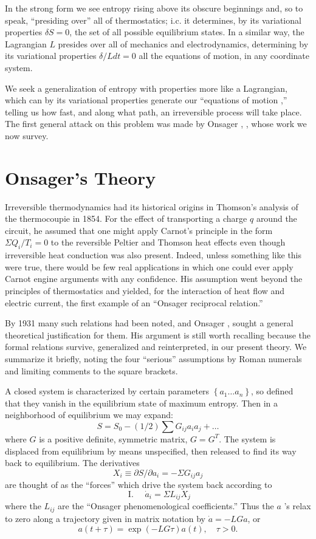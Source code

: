 \documentclass{article}
\begin{document}
In the strong form we see entropy rising above its obscure beginnings and, so to speak, ``presiding over'' all of thermostatics; i.c. it determines, by its variational properties $\delta S=0$, the set of all possible equilibrium states. In a similar way, the Lagrangian $L$ presides over all of mechanics and electrodynamics, determining by its variational properties $\delta / L d t=0$ all the equations of motion, in any coordinate system.

We seek a generalization of entropy with properties more like a Lagrangian, which can by its variational properties generate our ``equations of motion ,'' telling us how fast, and along what path, an irreversible process will take place. The first general attack on this problem was made by Onsager \cite{onsager1931a}, \cite{onsager1931b}, whose work we now survey.

\section{Onsager's Theory}

Irreversible thermodynamics had its historical origins in Thomson's analysis of the thermocoupie in 1854. For the effect of transporting a charge $q$ around the circuit, he assumed that one might apply Carnot's principle in the form $\Sigma Q_i / T_i=0$ to the reversible Peltier and Thomson heat effects even though irreversible heat conduction was also present. Indeed, unless something like this were true, there would be few real applications in which one could ever apply Carnot engine arguments with any confidence. His assumption went beyond the principles of thermostatics and yielded, for the interaction of heat flow and electric current, the first example of an ``Onsager reciprocal relation.''

By 1931 many such relations had been noted, and Onsager \cite{onsager1931a}, \cite{onsager1931b} sought a general theoretical justification for them. His argument is still worth recalling because the formal relations survive, generalized and reinterpreted, in our present theory. We summarize it briefly, noting the four ``serious'' assumptions by Roman numerals and limiting comments to the square brackets.

A closed system is characterized by certain parameters $\left\{a_1 \ldots a_n\right\}$, so defined that they vanish in the equilibrium state of maximum entropy. Then in a neighborhood of equilibrium we may expand:
$$
S=S_0-(1 / 2) \sum G_{i j} a_i a_j+\ldots
$$
where $G$ is a positive definite, symmetric matrix, $G=G^T$. The system is displaced from equilibrium by means unspecified, then released to find its way back to equilibrium. The derivatives
$$
X_i \equiv \partial S / \partial a_i=-\Sigma G_{i j} a_j
$$
are thought of as the ``forces'' which drive the system back according to
$$
\text { I. } \quad \dot{a}_i=\Sigma L_{i j} X_j
$$
where the $L_{i j}$ are the ``Onsager phenomenological coefficients.'' Thus the $a$ 's relax to zero along a trajectory given in matrix notation by $\dot{a}=-L G a$, or
$$
a(t+\tau)=\exp (-L G \tau) a(t), \quad \tau>0 .
$$
\end{document}
